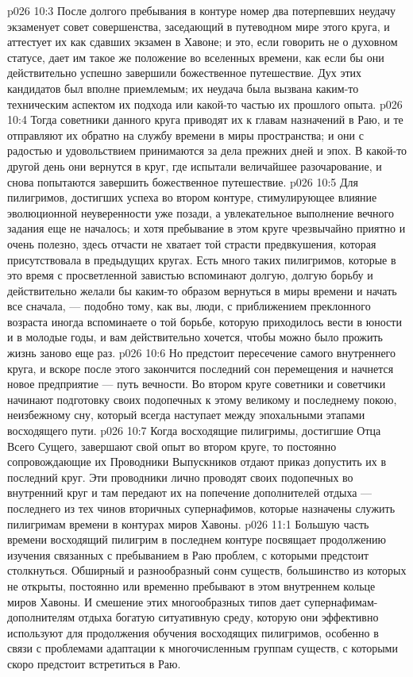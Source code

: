 \vs p026 10:3 После долгого пребывания в контуре номер два потерпевших неудачу экзаменует совет совершенства, заседающий в путеводном мире этого круга, и аттестует их как сдавших экзамен в Хавоне; и это, если говорить не о духовном статусе, дает им такое же положение во вселенных времени, как если бы они действительно успешно завершили божественное путешествие. Дух этих кандидатов был вполне приемлемым; их неудача была вызвана каким\hyp{}то техническим аспектом их подхода или какой\hyp{}то частью их прошлого опыта.
\vs p026 10:4 Тогда советники данного круга приводят их к главам назначений в Раю, и те отправляют их обратно на службу времени в миры пространства; и они с радостью и удовольствием принимаются за дела прежних дней и эпох. В какой\hyp{}то другой день они вернутся в круг, где испытали величайшее разочарование, и снова попытаются завершить божественное путешествие.
\vs p026 10:5 Для пилигримов, достигших успеха во втором контуре, стимулирующее влияние эволюционной неуверенности уже позади, а увлекательное выполнение вечного задания еще не началось; и хотя пребывание в этом круге чрезвычайно приятно и очень полезно, здесь отчасти не хватает той страсти предвкушения, которая присутствовала в предыдущих кругах. Есть много таких пилигримов, которые в это время с просветленной завистью вспоминают долгую, долгую борьбу и действительно желали бы каким\hyp{}то образом вернуться в миры времени и начать все сначала, --- подобно тому, как вы, люди, с приближением преклонного возраста иногда вспоминаете о той борьбе, которую приходилось вести в юности и в молодые годы, и вам действительно хочется, чтобы можно было прожить жизнь заново еще раз.
\vs p026 10:6 Но предстоит пересечение самого внутреннего круга, и вскоре после этого закончится последний сон перемещения и начнется новое предприятие --- путь вечности. Во втором круге советники и советчики начинают подготовку своих подопечных к этому великому и последнему покою, неизбежному сну, который всегда наступает между эпохальными этапами восходящего пути.
\vs p026 10:7 Когда восходящие пилигримы, достигшие Отца Всего Сущего, завершают свой опыт во втором круге, то постоянно сопровождающие их Проводники Выпускников отдают приказ допустить их в последний круг. Эти проводники лично проводят своих подопечных во внутренний круг и там передают их на попечение дополнителей отдыха --- последнего из тех чинов вторичных супернафимов, которые назначены служить пилигримам времени в контурах миров Хавоны.
\vs p026 11:1 Большую часть времени восходящий пилигрим в последнем контуре посвящает продолжению изучения связанных с пребыванием в Раю проблем, с которыми предстоит столкнуться. Обширный и разнообразный сонм существ, большинство из которых не открыты, постоянно или временно пребывают в этом внутреннем кольце миров Хавоны. И смешение этих многообразных типов дает супернафимам\hyp{}дополнителям отдыха богатую ситуативную среду, которую они эффективно используют для продолжения обучения восходящих пилигримов, особенно в связи с проблемами адаптации к многочисленным группам существ, с которыми скоро предстоит встретиться в Раю.

